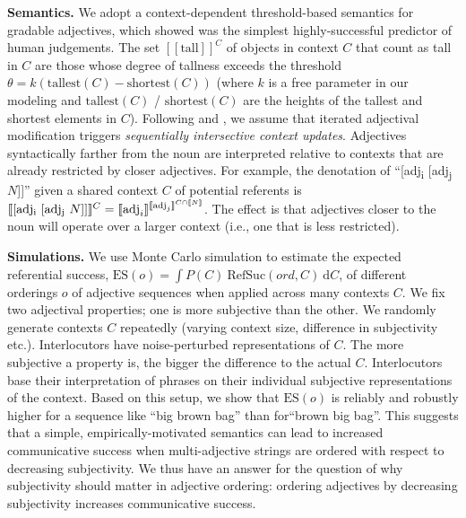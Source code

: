 \documentclass[12pt]{article}
\newcommand{\den}[1]{\ensuremath{[\![#1]\!]}}
\begin{document}
\noindent \textbf{Semantics.} We adopt a context-dependent threshold-based semantics for
gradable adjectives, which \cite{schmidtetal2009} showed was the simplest highly-successful predictor of human judgements. The set $\den{\text{tall}}^C$ of objects in context
$C$ that count as tall in $C$ are those whose degree of tallness exceeds the threshold $\theta
= k(\text{tallest}(C) - \text{shortest}(C))$ (where $k$ is a free parameter in our modeling and
$\text{tallest}(C)$ / $\text{shortest}(C)$ are the heights of the tallest and shortest elements
in $C$). Following \cite{scontrasetalSPadjectives} and \cite{simonic2018}, we assume that
iterated adjectival modification triggers \emph{sequentially intersective context updates}.
Adjectives syntactically farther from the noun are interpreted relative to contexts that are
already restricted by closer adjectives. For example, the denotation of ``[adj\textsubscript{i}
[adj\textsubscript{j} $N$]]'' given a shared context $C$ of potential referents is
$\den{\text{[adj\textsubscript{i} [adj\textsubscript{j} $N$]]}}^{C} =
\den{\text{adj}_i}^{\den{\text{adj}_j}^{C\cap \den{N}}}$. The effect is that adjectives closer
to the noun will operate over a larger context (i.e., one that is less restricted).

\noindent \textbf{Simulations.} We use Monte Carlo simulation to estimate the expected
referential success, $\text{ES}(o) = \int P(C) \ \text{RefSuc}(ord,C) \ \text{d}C$, of
different orderings $o$ of adjective sequences when applied across many contexts $C$. We fix
two adjectival properties; one is more subjective than the other. We randomly generate contexts $C$
repeatedly (varying context size, difference in subjectivity etc.). Interlocutors have
noise-perturbed representations of $C$. The more subjective a property is, the bigger the
difference to the actual $C$. Interlocutors base their interpretation of phrases on their
individual subjective representations of the context. Based on this setup, we show that
$\text{ES}(o)$ is reliably and robustly higher for a sequence like ``big brown bag'' than
for``brown big bag''. This suggests that a simple, empirically-motivated semantics can lead to
increased communicative success when multi-adjective strings are ordered with respect to
decreasing subjectivity. We thus have an answer for the question of why subjectivity should
matter in adjective ordering: ordering adjectives by decreasing subjectivity increases
communicative success.

\printbibliography
\end{document}
